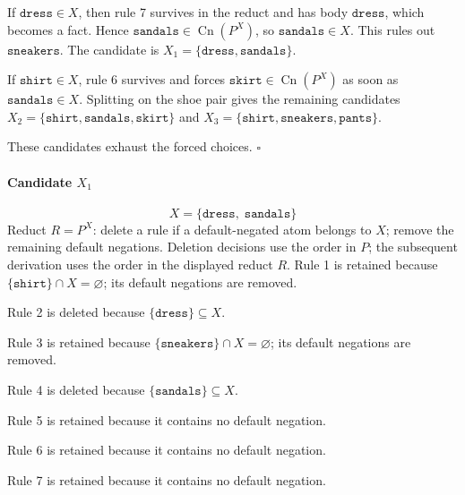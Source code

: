 \documentclass[a4paper,11pt]{article}
\newif\ifexplain
\newcommand{\explain}[1]{\ifexplain\begin{erklbox}#1\end{erklbox}\fi}
\newcommand{\at}[1]{\texttt{#1}}
\begin{document}
If $\at{dress}\in X$, then rule 7 survives in the reduct and has body $\at{dress}$, which becomes a fact. Hence $\at{sandals}\in\operatorname{Cn}(P^X)$, so $\at{sandals}\in X$. This rules out $\at{sneakers}$. The candidate is $X_1=\{\at{dress},\at{sandals}\}$.
\explain{Regel 7 hängt $\at{sandals}$ an $\at{dress}$: Wer die Hose--Schuh--Kette einmal anwirft, bekommt auch die Sandalen. Darum kann $\at{dress}$ nie allein stehen.}
If $\at{shirt}\in X$, rule 6 survives and forces $\at{skirt}\in\operatorname{Cn}(P^X)$ as soon as $\at{sandals}\in X$. Splitting on the shoe pair gives the remaining candidates $X_2=\{\at{shirt},\at{sandals},\at{skirt}\}$ and $X_3=\{\at{shirt},\at{sneakers},\at{pants}\}$.
\explain{Bei $\at{shirt}$ entscheidet das Schuhpaar: Mit Sandalen feuert Regel 6 und zieht den Rock nach; mit Sneakern feuert Regel 5 und zieht die Hose nach. Alle anderen Atome haben dann keine unterstützende Regel mehr.}
These candidates exhaust the forced choices. $\square$
\paragraph{Candidate $X_1$}
\[
X=\{\at{dress},\;\at{sandals}\}
\]
Reduct $R=P^X$: delete a rule if a default-negated atom belongs to $X$; remove the remaining default negations. Deletion decisions use the order in $P$; the subsequent derivation uses the order in the displayed reduct $R$.
Rule 1 is retained because $\{\at{shirt}\}\cap X=\varnothing$; its default negations are removed.

Rule 2 is deleted because $\{\at{dress}\}\subseteq X$.

Rule 3 is retained because $\{\at{sneakers}\}\cap X=\varnothing$; its default negations are removed.

Rule 4 is deleted because $\{\at{sandals}\}\subseteq X$.

Rule 5 is retained because it contains no default negation.

Rule 6 is retained because it contains no default negation.

Rule 7 is retained because it contains no default negation.
\end{document}
